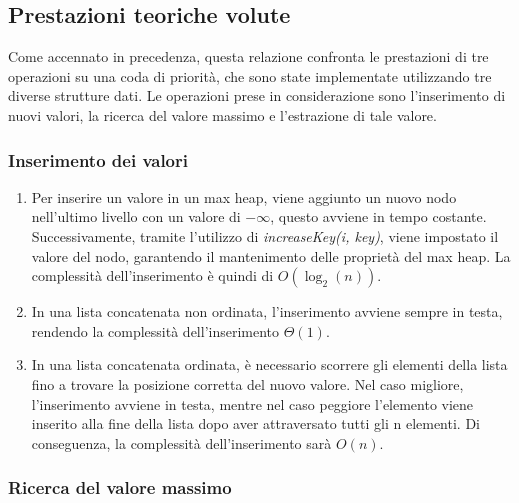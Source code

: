 \documentclass{article}
\begin{document}
\clearpage

\subsection{Prestazioni teoriche volute}

Come accennato in precedenza, questa relazione confronta le prestazioni di tre operazioni su una coda di priorità, che sono state implementate utilizzando tre diverse strutture dati. Le operazioni prese in considerazione sono l'inserimento di nuovi valori, la ricerca del valore massimo e l'estrazione di tale valore.

\subsubsection{Inserimento dei valori}

    \begin{enumerate}
    
    \item Per inserire un valore in un max heap, viene aggiunto un nuovo nodo nell'ultimo livello con un valore di $-\infty$, questo avviene in tempo costante. Successivamente, tramite l'utilizzo di \textit{increaseKey(i, key)}, viene impostato il valore del nodo, garantendo il mantenimento delle proprietà del max heap. La complessità dell'inserimento è quindi di $O(\log_2(n))$.
    
    \item In una lista concatenata non ordinata, l'inserimento avviene sempre in testa, rendendo la complessità dell'inserimento $\Theta(1)$.
    
    \item In una lista concatenata ordinata, è necessario scorrere gli elementi della lista fino a trovare la posizione corretta del nuovo valore. Nel caso migliore, l'inserimento avviene in testa, mentre nel caso peggiore l'elemento viene inserito alla fine della lista dopo aver attraversato tutti gli n elementi. Di conseguenza, la complessità dell'inserimento sarà $O(n)$.
    
    \end{enumerate}

\subsubsection{Ricerca del valore massimo}
\end{document}
